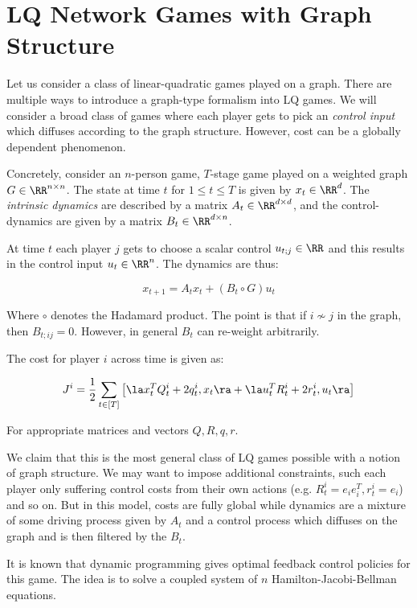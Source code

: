 \section{LQ Network Games with Graph Structure}

Let us consider a class of linear-quadratic games played on a graph. There are multiple ways to introduce a graph-type formalism into LQ games. We will consider a broad class of games where each player gets to pick an {\em control input} which diffuses according to the graph structure. However, cost can be a globally dependent phenomenon. 

Concretely, consider an $n$-person game, $T$-stage game played on a weighted graph $G \in \RR^{n \times n}$. The state at time $t$ for $1 \leq t \leq T$ is given by $x_t \in \RR^d$. The {\em intrinsic dynamics} are described by a matrix $A_t \in \RR^{d \times d}$, and the control-dynamics are given by a matrix $B_t \in \RR^{d \times n}$. 

At time $t$ each player $j$ gets to choose a scalar control $u_{t;j} \in \RR$ and this results in the control input $u_t \in \RR^n$. The dynamics are thus: 

\[
x_{t+1} = A_t x_{t} + (B_t \circ G) u_t
\]

Where $\circ$ denotes the Hadamard product. The point is that if $i \not\sim j$ in the graph, then $B_{t;ij} = 0$. However, in general $B_t$ can re-weight arbitrarily. 

The cost for player $i$ across time is given as: 

\[
J^i = \frac 1 2 \sum_{t \in [T]} \big[ \la x_t^T Q_t^i + 2 q_{t}^{i}, x_t \ra 
+ \la u_t^T R_t^i + 2 r_t^i, u_t \ra
\big]
\]

For appropriate matrices and vectors $Q, R, q, r$. 

We claim that this is the most general class of LQ games possible with a notion of graph structure. We may want to impose additional constraints, such each player only suffering control costs from their own actions (e.g. $R_t^i = e_i e_i^T, r_t^i = e_i$) and so on. But in this model, costs are fully global while dynamics are a mixture of some driving process given by $A_t$ and a control process which diffuses on the graph and is then filtered by the $B_t$. 

It is known that dynamic programming gives optimal feedback control policies for this game. The idea is to solve a coupled system of $n$ Hamilton-Jacobi-Bellman equations. 

